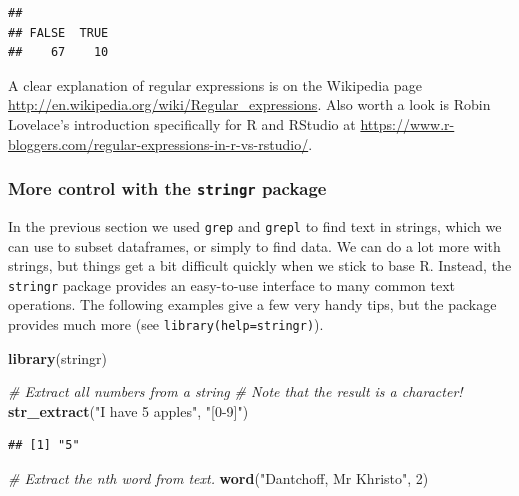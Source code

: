 \documentclass[]{book}
\newenvironment{Shaded}{\begin{snugshade}}{\end{snugshade}}
\newcommand{\CommentTok}[1]{\textcolor[rgb]{0.56,0.35,0.01}{\textit{#1}}}
\newcommand{\DecValTok}[1]{\textcolor[rgb]{0.00,0.00,0.81}{#1}}
\newcommand{\KeywordTok}[1]{\textcolor[rgb]{0.13,0.29,0.53}{\textbf{#1}}}
\newcommand{\NormalTok}[1]{#1}
\newcommand{\StringTok}[1]{\textcolor[rgb]{0.31,0.60,0.02}{#1}}
\let\BeginKnitrBlock\begin \let\EndKnitrBlock\end
\begin{document}
\begin{verbatim}
## 
## FALSE  TRUE 
##    67    10
\end{verbatim}

\BeginKnitrBlock{rmdreading}
A clear explanation of regular expressions is on the Wikipedia page \url{http://en.wikipedia.org/wiki/Regular_expressions}. Also worth a look is Robin Lovelace's introduction specifically for R and RStudio at \url{https://www.r-bloggers.com/regular-expressions-in-r-vs-rstudio/}.
\EndKnitrBlock{rmdreading}

\hypertarget{more-control-with-the-stringr-package}{%
\subsubsection{\texorpdfstring{More control with the \texttt{stringr} package}{More control with the stringr package}}\label{more-control-with-the-stringr-package}}

In the previous section we used \texttt{grep} and \texttt{grepl} to find text in strings, which we can use to subset dataframes, or simply to find data. We can do a lot more with strings, but things get a bit difficult quickly when we stick to base R. Instead, the \texttt{stringr} package provides an easy-to-use interface to many common text operations. The following examples give a few very handy tips, but the package provides much more (see \texttt{library(help=stringr)}).

\begin{Shaded}
\begin{Highlighting}[]
\KeywordTok{library}\NormalTok{(stringr)}

\CommentTok{# Extract all numbers from a string}
\CommentTok{# Note that the result is a character!}
\KeywordTok{str_extract}\NormalTok{(}\StringTok{"I have 5 apples"}\NormalTok{, }\StringTok{"[0-9]"}\NormalTok{)}
\end{Highlighting}
\end{Shaded}

\begin{verbatim}
## [1] "5"
\end{verbatim}

\begin{Shaded}
\begin{Highlighting}[]
\CommentTok{# Extract the nth word from text.}
\KeywordTok{word}\NormalTok{(}\StringTok{"Dantchoff, Mr Khristo"}\NormalTok{, }\DecValTok{2}\NormalTok{)}
\end{Highlighting}
\end{Shaded}
\end{document}
